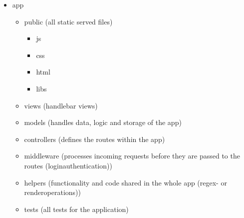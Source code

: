 \documentclass[10pt,a4paper,landscape]{article}
\begin{document}
\begin{itemize}
        \renewcommand{\labelitemi}{$--$}
        \renewcommand{\labelitemii}{$--$}
        \renewcommand{\labelitemiii}{$--$}
        \renewcommand{\labelitemiv}{$--$}
        \item
            app\\
            \begin{itemize}
                    \item
                        public (all static served files)\\
                        \begin{itemize}
                                \item
                                    js\\
                                \item 
                                    css\\
                                \item 
                                    html\\
                                \item
                                    libs\\
                        \end{itemize}
                    \item
                        views (handlebar views)\\
                    \item
                        models (handles data, logic and storage of the app)\\
                    \item
                        controllers (defines the routes within the app)\\
                    \item
                        middleware (processes incoming requests before they are passed to the routes (loginauthentication))\\
                    \item
                        helpers (functionality and code shared in the whole app (regex- or renderoperations))\\
                    \item
                        tests (all tests for the application)\\
            \end{itemize}
\end{itemize}
\renewcommand{\labelitemi}{$\bullet$}
\renewcommand{\labelitemii}{$\cdot$}
\renewcommand{\labelitemiii}{$\diamond$}
\renewcommand{\labelitemiv}{$\ast$}
\end{document}
